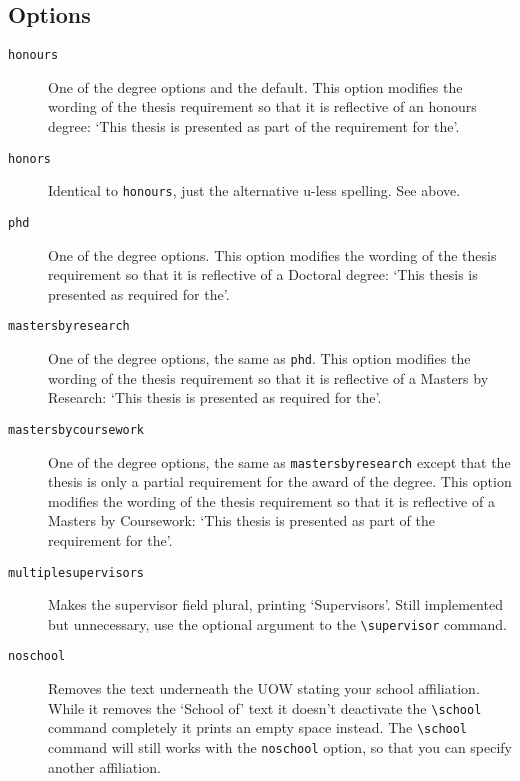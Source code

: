 \documentclass[12pt,oneside]{article}
\newcommand{\oporcom}[1]{\texttt{\color{RoyalBlue}#1}} %
\begin{document}
\subsection*{Options}
\begin{description}
    \item[\oporcom{honours}]
    One of the degree options and the default. This option modifies the wording of the thesis requirement so that it is reflective of an honours degree: `This thesis is presented as part of the requirement for the'.
    
    \item[\oporcom{honors}]
    Identical to \oporcom{honours}, just the alternative u-less spelling. See above.
    
    \item[\oporcom{phd}]
    One of the degree options. This option modifies the wording of the thesis requirement so that it is reflective of a Doctoral degree: `This thesis is presented as required for the'.
    
    \item[\oporcom{mastersbyresearch}]
    One of the degree options, the same as \oporcom{phd}. This option modifies the wording of the thesis requirement so that it is reflective of a Masters by Research: `This thesis is presented as required for the'.
    
    \item[\oporcom{mastersbycoursework}]
    One of the degree options, the same as \oporcom{mastersbyresearch} except that the thesis is only a partial requirement for the award of the degree. This option modifies the wording of the thesis requirement so that it is reflective of a Masters by Coursework: `This thesis is presented as part of the requirement for the'.
    
    \item[\oporcom{multiplesupervisors}]
    Makes the supervisor field plural, printing `Supervisors'. Still implemented but unnecessary, use the optional argument to the \oporcom{\textbackslash{}supervisor} command.
    
    \item[\oporcom{noschool}]
    Removes the text underneath the UOW stating your school affiliation. While it removes the `School of' text it doesn't deactivate the \oporcom{\textbackslash{}school} command completely it prints an empty space instead. The \oporcom{\textbackslash{}school} command will still works with the \oporcom{noschool} option, so that you can specify another affiliation.
    

\end{description}
\end{document}
